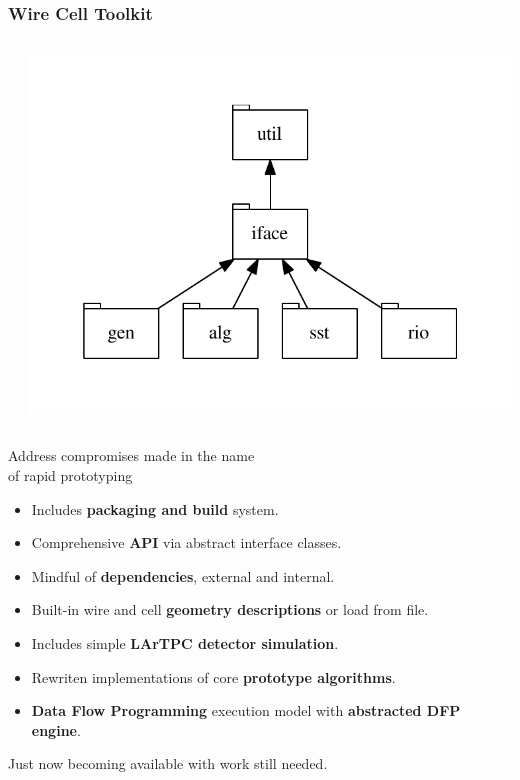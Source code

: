 \begin{frame}
  \frametitle{Wire Cell Toolkit}

  \begin{columns}
    \begin{column}{0.65\paperwidth}
    \end{column}
    \begin{column}{0.35\paperwidth}
      \vspace{-20mm}
      \includegraphics[width=\textwidth]{deps.pdf}      
    \end{column}
  \end{columns}

  \vspace{-15mm}

  Address compromises made in the name\\
  of rapid prototyping 
  \begin{itemize}
  \item Includes \textbf{packaging and build} system.
  \item Comprehensive \textbf{API} via abstract interface classes.
  \item Mindful of \textbf{dependencies}, external and internal.
  \item Built-in wire and cell \textbf{geometry descriptions} or load from file.
  \item Includes simple \textbf{LArTPC detector simulation}.
  \item Rewriten implementations of core \textbf{prototype algorithms}.
  \item \textbf{Data Flow Programming} execution model with \textbf{abstracted DFP engine}.
  \end{itemize}

  \vfill

  Just now becoming available with work still needed.

\end{frame}


